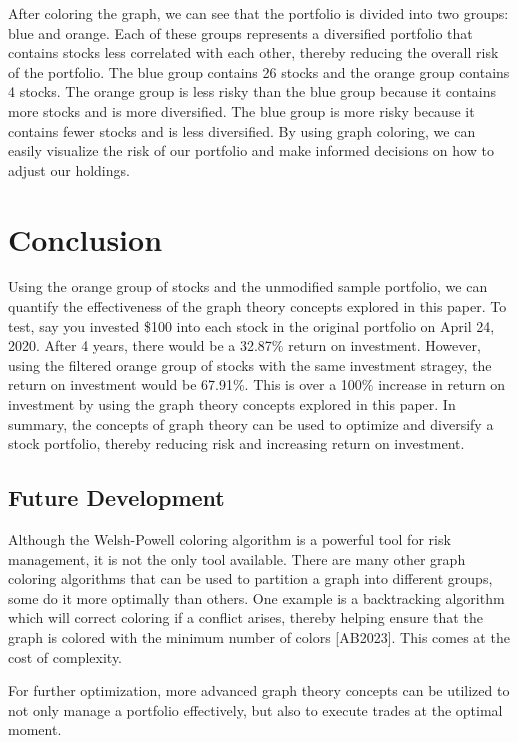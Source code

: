 \documentclass{article}
\begin{document}
After coloring the graph, we can see that the portfolio is divided into two groups: blue and orange. Each of these groups represents a diversified portfolio that contains stocks less correlated with each other, thereby reducing the overall risk of the portfolio. The blue group contains 26 stocks and the orange group contains 4 stocks. The orange group is less risky than the blue group because it contains more stocks and is more diversified. The blue group is more risky because it contains fewer stocks and is less diversified. By using graph coloring, we can easily visualize the risk of our portfolio and make informed decisions on how to adjust our holdings. 

\section{Conclusion}

Using the orange group of stocks and the unmodified sample portfolio, we can quantify the effectiveness of the graph theory concepts explored in this paper. To test, say you invested \$100 into each stock in the original portfolio on April 24, 2020. After 4 years, there would be a 32.87\% return on investment. However, using the filtered orange group of stocks with the same investment stragey, the return on investment would be 67.91\%. This is over a 100\% increase in return on investment by using the graph theory concepts explored in this paper. In summary, the concepts of graph theory can be used to optimize and diversify a stock portfolio, thereby reducing risk and increasing return on investment. 


\subsection{Future Development}

Although the Welsh-Powell coloring algorithm is a powerful tool for risk management, it is not the only tool available. There are many other graph coloring algorithms that can be used to partition a graph into different groups, some do it more optimally than others. One example is a backtracking algorithm which will correct coloring if a conflict arises, thereby helping ensure that the graph is colored with the minimum number of colors [AB2023]. This comes at the cost of complexity.

For further optimization, more advanced graph theory concepts can be utilized to not only manage a portfolio effectively, but also to execute trades at the optimal moment.
\end{document}
